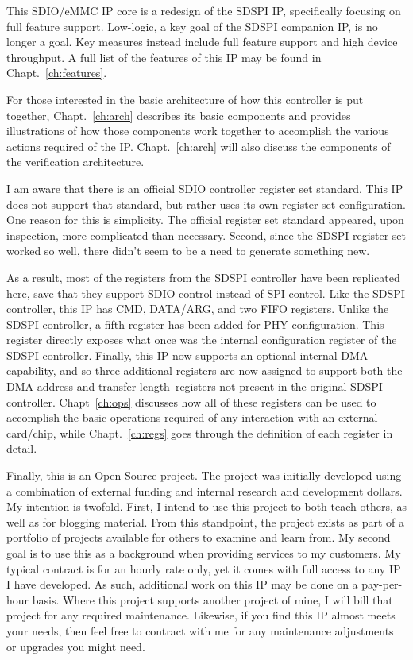 \documentclass{gqtekspec}
\begin{document}
This SDIO/eMMC IP core is a redesign of the SDSPI IP, specifically focusing on
full feature support.  Low-logic, a key goal of the SDSPI companion IP, is no
longer a goal.  Key measures instead include full feature support and high
device throughput.  A full list of the features of this IP may be found in
Chapt.~\ref{ch:features}.

For those interested in the basic architecture of how this controller is put
together, Chapt.~\ref{ch:arch} describes its basic components and provides
illustrations of how those components work together to accomplish the various
actions required of the IP.  Chapt.~\ref{ch:arch} will also discuss the
components of the verification architecture.

I am aware that there is an official SDIO controller register set standard.
This IP does not support that standard, but rather uses its own register set
configuration.  One reason for this is simplicity.  The official register set
standard appeared, upon inspection, more complicated than necessary.  Second,
since the SDSPI register set worked so well, there didn't seem to be a need to
generate something new.

As a result, most of the registers from the SDSPI controller have been
replicated here, save that they support SDIO control instead of SPI control.
Like the SDSPI controller, this IP has CMD, DATA/ARG, and two FIFO registers.
Unlike the SDSPI controller, a fifth register has been added for PHY
configuration.  This register directly exposes what once was the internal
configuration register of the SDSPI controller.  Finally, this IP now supports
an optional internal DMA capability, and so three additional registers are now
assigned to support both the DMA address and transfer length--registers not
present in the original SDSPI controller.  Chapt~\ref{ch:ops} discusses how
all of these registers can be used to accomplish the basic operations required
of any interaction with an external card/chip, while Chapt.~\ref{ch:regs} goes
through the definition of each register in detail.

Finally, this is an Open Source project.  The project was initially
developed using a combination of external funding and internal research and
development dollars.  My intention is twofold.  First, I intend to use this
project to both teach others, as well as for blogging material.  From this
standpoint, the project exists as part of a portfolio of projects available for
others to examine and learn from.  My second goal is to use this as a
background when providing services to my customers.  My typical contract is
for an hourly rate only, yet it comes with full access to any IP I have
developed.  As such, additional work on this IP may be done on a pay-per-hour
basis.  Where this project supports another project of mine, I will bill that
project for any required maintenance.  Likewise, if you find this IP almost
meets your needs, then feel free to contract with me for any maintenance
adjustments or upgrades you might need.
\end{document}
